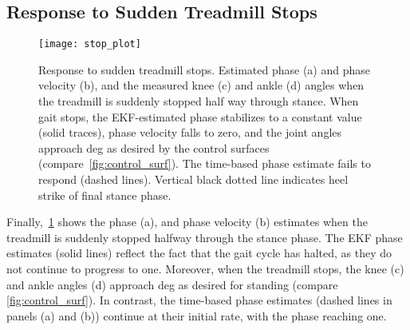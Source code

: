 \subsection{Response to Sudden Treadmill Stops}
\begin{figure}[t]
    \centering
    \texttt{[image: stop\_plot]} 
    \caption[Response to sudden treadmill stops]{Response to sudden treadmill
    stops. Estimated phase (a) and phase velocity (b), and the measured knee (c)
    and ankle (d) angles when the treadmill is suddenly stopped half way through
    stance.  When gait stops, the EKF-estimated phase stabilizes to a constant
    value (solid traces), phase velocity falls to zero, and the joint angles
    approach \unit[5]{deg} as desired by the control surfaces
    (compare~\cref{fig:control_surf}). The time-based phase estimate fails to
    respond (dashed lines). Vertical black dotted line indicates heel strike of
    final stance phase.}\label{fig:stop_plot}
\end{figure}

Finally,~\cref{fig:stop_plot} shows the phase (a), and phase velocity (b)
estimates when the treadmill is suddenly stopped halfway through the stance
phase. The EKF phase estimates (solid lines) reflect the fact that the gait
cycle has halted, as they do not continue to progress to one. Moreover, when
the treadmill stops, the knee (c) and ankle angles (d) approach \unit[5]{deg} as
desired for standing (compare \cref{fig:control_surf}). In contrast, the
time-based phase estimates (dashed lines in panels (a) and (b)) continue at
their initial rate, with the phase reaching one. 
